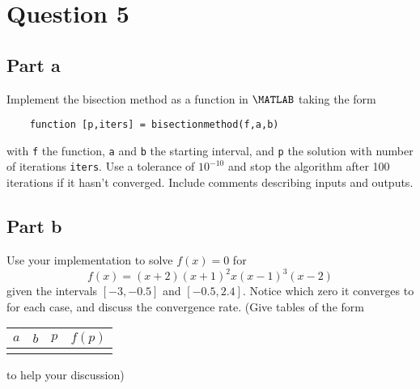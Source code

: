 \section{Question 5}

\subsection{Part a}

\begin{question}
    Implement the bisection method as a function in $\MATLAB$ taking the form
    \begin{verbatim}
	function [p,iters] = bisectionmethod(f,a,b)
	\end{verbatim}
	with \verb+f+ the function, \verb+a+ and \verb+b+ the starting interval, and \verb+p+ the solution with number of iterations \verb+iters+. Use a tolerance of $10^{-10}$ and stop the algorithm after 100 iterations if it hasn't converged. Include comments describing inputs and outputs.
\end{question}

\begin{answer}
    
\end{answer}

\subsection{Part b}

\begin{question}
    Use your implementation to solve $f(x) = 0$ for $$f(x) = (x+2)(x+1)^2x(x-1)^3(x-2)$$ given the intervals $[-3,-0.5]$ and $[-0.5,2.4]$. Notice which zero it converges to for each case, and discuss the convergence rate. (Give tables of the form \begin{tabular}{c|c|c|c} $a$ & $b$ & $p$ & $f(p)$ \\ \hline &&& \end{tabular} to help your discussion)
\end{question}

\begin{answer}
    
\end{answer}